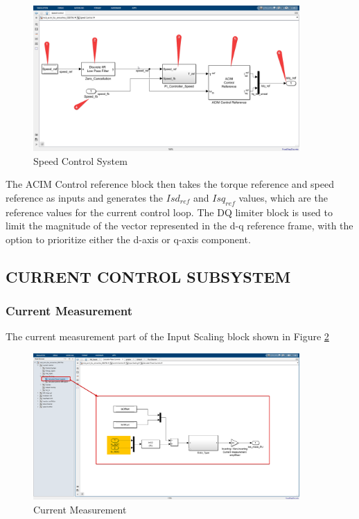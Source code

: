 \begin{figure}[H]
	\centering
	\includegraphics[width=4in]{sections/section3/images/simulation/speedControl/speedController.png}
	\caption{Speed Control System}
	\label{fig:speed_control_system}
\end{figure}


The ACIM Control reference block then takes the torque reference and speed reference as inputs and generates the $Isd_{ref}$ and $Isq_{ref}$ values, which are the reference values for the current control loop. The DQ limiter block is used to limit the magnitude of the vector represented in the d-q reference frame, with the option to prioritize either the d-axis or q-axis component.


\subsection{CURRENT CONTROL SUBSYSTEM}


\subsubsection{Current Measurement}


The current measurement part of the Input Scaling block shown in Figure \ref{fig:current_measurement}

\begin{figure}[H]
	\centering
	\includegraphics[width=4in]{sections/section3/images/simulation/inputScaling/currentMeasurement.png}
	\caption{Current Measurement}
	\label{fig:current_measurement}
\end{figure}


